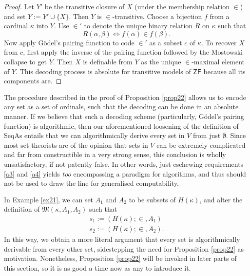 \documentclass[12pt]{article}
\numberwithin{equation}{section}
\begin{document}
\begin{proof}
Let $Y'$ be the transitive closure of $X$ (under the membership relation $\in$) and set $Y := Y' \cup \{X\}$. Then $Y$ is $\in$-transitive. Choose a bijection $f$ from a cardinal $\kappa$ into $Y$. Use $\in'$ to denote the unique binary relation $R$ on $\kappa$ such that
\begin{equation*}
    R(\alpha, \beta) \iff f(\alpha) \in f(\beta) \text{.}
\end{equation*}
Now apply G\"{o}del's pairing function to code $\in'$ as a subset $c$ of $\kappa$. To recover $X$ from $c$, first apply the inverse of the pairing function followed by the Mostowski collapse to get $Y$. Then $X$ is definable from $Y$ as the unique $\in$-maximal element of $Y$. This decoding process is absolute for transitive models of $\mathsf{ZF}$ because all its components are.
\end{proof}

The procedure described in the proof of Proposition \ref{prop22} allows us to encode any set as a set of ordinals, such that the decoding can be done in an absolute manner. If we believe that such a decoding scheme (particularly, G\"{o}del's pairing function) is algorithmic, then our aforementioned loosening of the definition of SeqAs entails that we can algorithmically derive every set in $V$ from just $\emptyset$. Since most set theorists are of the opinion that sets in $V$ can be extremely complicated and far from constructible in a very strong sense, this conclusion is wholly unsatisfactory, if not patently false. In other words, just eschewing requirements \ref{a3} and \ref{a4} yields \emph{too} encompassing a paradigm for algorithms, and thus should not be used to draw the line for generalised computability.

\begin{rem}
In Example \ref{ex21}, we can set $A_1$ and $A_2$ to be subsets of $H(\kappa)$, and alter the definition of $\mathfrak{M}(\kappa, A_1, A_2)$ such that 
\begin{gather*}
    s_1 := (H(\kappa); \in, A_1) \\
    s_2 := (H(\kappa); \in, A_2) \text{.}
\end{gather*}
In this way, we obtain a more literal argument that every set is algorithmically derivable from every other set, sidestepping the need for Proposition \ref{prop22} as motivation. Nonetheless, Proposition \ref{prop22} will be invoked in later parts of this section, so it is as good a time now as any to introduce it.
\end{rem}
\end{document}
